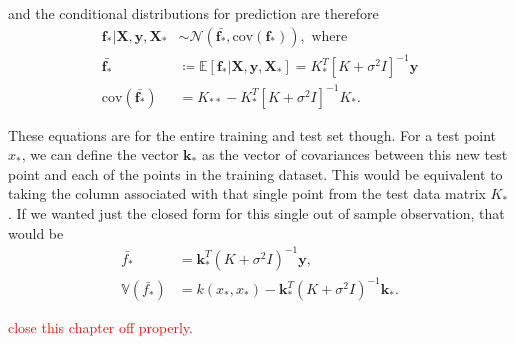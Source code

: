 and the conditional distributions for prediction are therefore 
\begin{align*}
	\boldsymbol{f}_* | \boldsymbol{X}, \boldsymbol{y}, \boldsymbol{X}_* &\sim \mathcal{N}(\bar{\boldsymbol{f}_*}, \text{cov}(\boldsymbol{f}_*)), \text{ where} \\
	\bar{\boldsymbol{f}_*} &\coloneqq \mathbb{E}[\boldsymbol{f}_* | \boldsymbol{X}, \boldsymbol{y}, \boldsymbol{X}_*] = K_*^T [K + \sigma^2 I]^{-1} \boldsymbol{y} \\
	\text{cov}(\bar{\boldsymbol{f}_*}) &= K_{**} -  K_*^T [K + \sigma^2 I]^{-1} K_*.
\end{align*}

These equations are for the entire training and test set though. For a test point $x_*$, we can define the vector $\boldsymbol{k}_*$ as the vector of covariances between this new test point and each of the points in the training dataset. This would be equivalent to taking the column associated with that single point from the test data matrix $K_*$. If we wanted just the closed form for this single out of sample observation, that would be 
\begin{align*}
	\bar{f_*} &= \boldsymbol{k}_*^T(K + \sigma^2 I)^{-1} \boldsymbol{y}, \\
	\mathbb{V}(\bar{f_*}) &= k(x_*, x_*) - \boldsymbol{k}_*^T (K + \sigma^2 I)^{-1} \boldsymbol{k}_*.
\end{align*}

\textcolor{red}{close this chapter off properly.}



